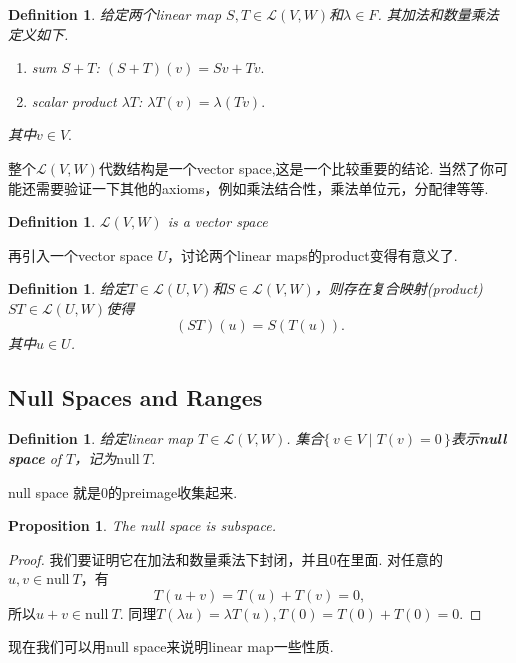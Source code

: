 \documentclass{article}
\newtheorem{proposition}[theorem]{Proposition}
\newtheorem{definition}[theorem]{Definition}
\newcommand\Set[2]{\{\,#1\mid#2\,\}} %
\newcommand\nul[1]{\text{null}\ #1}
\begin{document}
\begin{definition}
\rm 给定两个linear map $S,T \in \mathcal{L}(V,W)$和$\lambda \in F$. 其加法和数量乘法定义如下. 
\begin{enumerate}
	\item sum $S+T$: $(S+T)(v) = Sv+Tv.$
	\item scalar product $\lambda T$: $\lambda T(v) = \lambda(Tv).$
\end{enumerate}
其中$v \in V.$
\end{definition}

{\color{blue} 整个$\mathcal{L}(V,W)$代数结构是一个vector space,这是一个比较重要的结论}. 当然了你可能还需要验证一下其他的axioms，例如乘法结合性，乘法单位元，分配律等等.

\begin{definition}
\rm $\mathcal{L}(V,W)$ is a vector space
\end{definition}

{\color{blue} 再引入一个vector space $U$，讨论两个linear maps的product变得有意义了}.

\begin{definition}
\rm 给定$T \in \mathcal{L}(U,V)$和$S \in \mathcal{L}(V,W)$，则存在复合映射(product) $ST \in \mathcal{L}(U,W)$使得
$$
	(ST)(u) = S(T(u)).
$$
其中$u \in U$. 
\end{definition}

\newpage
\subsection{Null Spaces and Ranges}

\begin{definition}
\rm 给定linear map $T \in \mathcal{L}(V,W)$. 集合$\Set{v \in V}{T(v)= 0}$表示\textbf{null space} of $T$，记为$\nul{T}$.
\end{definition}

{\color{blue} null space 就是0的preimage收集起来}.

\begin{proposition}
\rm The null space is subspace.
\end{proposition}

\begin{proof}
我们要证明它在加法和数量乘法下封闭，并且$0$在里面. 对任意的$u,v \in \nul{T}$，有\[T(u+v) = T(u) + T(v) = 0,\]所以$u+v \in \nul{T}$. 同理$T(\lambda u) = \lambda T(u), T(0)=T(0)+T(0)=0$.
\end{proof}

{\color{blue} 现在我们可以用null space来说明linear map一些性质}.
\end{document}
